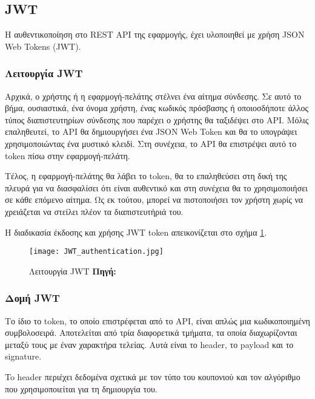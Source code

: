 \subsection{JWT}
Η αυθεντικοποίηση στο REST API της εφαρμογής, έχει υλοποιηθεί με χρήση JSON Web Tokens (JWT).

\subsubsection{Λειτουργία JWT}
Αρχικά, ο χρήστης ή η εφαρμογή-πελάτης στέλνει ένα αίτημα σύνδεσης. Σε αυτό το βήμα, ουσιαστικά, ένα όνομα χρήστη, ένας κωδικός πρόσβασης ή οποιοσδήποτε άλλος τύπος διαπιστευτηρίων σύνδεσης που παρέχει ο χρήστης θα ταξιδέψει στο API. Μόλις επαληθευτεί, το API θα δημιουργήσει ένα JSON Web Token και θα το υπογράψει χρησιμοποιώντας ένα μυστικό κλειδί. Στη συνέχεια, το API θα επιστρέψει αυτό το token πίσω στην εφαρμογή-πελάτη.

Τέλος, η εφαρμογή-πελάτης θα λάβει το token, θα το επαληθεύσει στη δική της πλευρά για να διασφαλίσει ότι είναι αυθεντικό και στη συνέχεια θα το χρησιμοποιήσει σε κάθε επόμενο αίτημα. Ως εκ τούτου, μπορεί να πιστοποιήσει τον χρήστη χωρίς να χρειάζεται να στείλει πλέον τα διαπιστευτήριά του.

Η διαδικασία έκδοσης και χρήσης JWT token απεικονίζεται στο σχήμα \ref{fig:JWT_authentication}.

\begin{figure}[h]
	\centering
	\texttt{[image: JWT\_authentication.jpg]}
	\caption[{Λειτουργία JWT}]{Λειτουργία JWT \textbf{Πηγή:} \cite{fig_JWT_authentication}}
	\label{fig:JWT_authentication}
\end{figure}

\subsubsection{Δομή JWT}
Το ίδιο το token, το οποίο επιστρέφεται από το API, είναι απλώς μια κωδικοποιημένη συμβολοσειρά. Αποτελείται από τρία διαφορετικά τμήματα, τα οποία διαχωρίζονται μεταξύ τους με έναν χαρακτήρα τελείας. Αυτά είναι το header, το payload και το signature.

To header περιέχει δεδομένα σχετικά με τον τύπο του κουπονιού και τον αλγόριθμο που χρησιμοποιείται για τη δημιουργία του.

